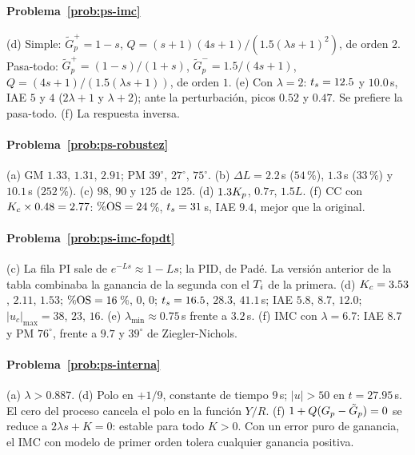\paragraph{Problema~\ref{prob:ps-imc}}
(d) Simple: $\tilde G_p^+=1-s$, $Q=(s+1)(4s+1)/(1.5(\lambda s+1)^2)$, de orden $2$. Pasa-todo: $\tilde G_p^+=(1-s)/(1+s)$, $\tilde G_p^-=1.5/(4s+1)$, $Q=(4s+1)/(1.5(\lambda s+1))$, de orden $1$. (e) Con $\lambda=2$: $t_s=12.5$ y $10.0$\,s, IAE $5$ y $4$ ($2\lambda+1$ y $\lambda+2$); ante la perturbación, picos $0.52$ y $0.47$. Se prefiere la pasa-todo. (f) La respuesta inversa.

\paragraph{Problema~\ref{prob:ps-robustez}}
(a) GM $1.33$, $1.31$, $2.91$; PM $39^\circ$, $27^\circ$, $75^\circ$. (b) $\Delta L=2.2$\,s ($54$\,\%), $1.3$\,s ($33$\,\%) y $10.1$\,s ($252$\,\%). (c) $98$, $90$ y $125$ de $125$. (d) $1.3K_p$, $0.7\tau$, $1.5L$. (f) CC con $K_c\times0.48=2.77$: $\%\mathrm{OS}=24$\,\%, $t_s=31$\,s, IAE $9.4$, mejor que la original.

\paragraph{Problema~\ref{prob:ps-imc-fopdt}}
(c) La fila PI sale de $e^{-Ls}\approx1-Ls$; la PID, de Padé. La versión anterior de la tabla combinaba la ganancia de la segunda con el $T_i$ de la primera. (d) $K_c=3.53$, $2.11$, $1.53$; $\%\mathrm{OS}=16$\,\%, $0$, $0$; $t_s=16.5$, $28.3$, $41.1$\,s; IAE $5.8$, $8.7$, $12.0$; $|u_c|_{\max}=38$, $23$, $16$. (e) $\lambda_{\min}\approx0.75$\,s frente a $3.2$\,s. (f) IMC con $\lambda=6.7$: IAE $8.7$ y PM $76^\circ$, frente a $9.7$ y $39^\circ$ de Ziegler-Nichols.

\paragraph{Problema~\ref{prob:ps-interna}}
(a) $\lambda>0.887$. (d) Polo en $+1/9$, constante de tiempo $9$\,s; $|u|>50$ en $t=27.95$\,s. El cero del proceso cancela el polo en la función $Y/R$. (f) $1+Q(G_p-\tilde G_p)=0$ se reduce a $2\lambda s+K=0$: estable para todo $K>0$. Con un error puro de ganancia, el IMC con modelo de primer orden tolera cualquier ganancia positiva.

\respuestaspausas
